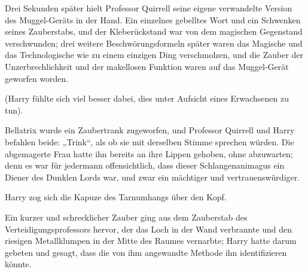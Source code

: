 Drei Sekunden später hielt Professor Quirrell seine eigene verwandelte Version des Muggel-Geräts in der Hand. Ein einzelnes gebelltes Wort und ein Schwenken seines Zauberstabs, und der Kleberückstand war von dem magischen Gegenstand verschwunden; drei weitere Beschwörungsformeln später waren das Magische und das Technologische wie zu einem einzigen Ding verschmolzen, und die Zauber der Unzerbrechlichkeit und der makellosen Funktion waren auf das Muggel-Gerät geworfen worden.

(Harry fühlte sich viel besser dabei, dies unter Aufsicht eines Erwachsenen zu tun).

Bellatrix wurde ein Zaubertrank zugeworfen, und Professor Quirrell und Harry befahlen beide: „Trink“, als ob sie mit derselben Stimme sprechen würden. Die abgemagerte Frau hatte ihn bereits an ihre Lippen gehoben, ohne abzuwarten; denn es war für jedermann offensichtlich, dass dieser Schlangenanimagus ein Diener des Dunklen Lords war, und zwar ein mächtiger und vertrauenswürdiger.

Harry zog sich die Kapuze des Tarnumhangs über den Kopf.

Ein kurzer und schrecklicher Zauber ging aus dem Zauberstab des Verteidigungsprofessors hervor, der das Loch in der Wand verbrannte und den riesigen Metallklumpen in der Mitte des Raumes vernarbte; Harry hatte darum gebeten und gesagt, dass die von ihm angewandte Methode ihn identifizieren könnte.

